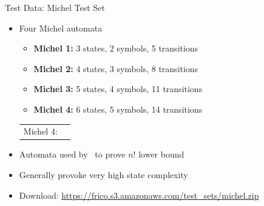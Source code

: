 \documentclass[12pt]{beamer}
\newcommand{\fat}[1]{\textbf{#1}}
\newcommand{\Michel}{
\begin{tikzpicture}[my automaton,semithick]
\scriptsize
\node[state,initial,accepting] (0)               {$q_0$};
\node[state,yshift=-0.2cm]                   (x) [below=of 0]  {$q_\#$};
\draw[->] (0) edge node[left] {\tiny\#} (x);
\draw[->] (x) edge[my below,loop] node[below] {\tiny $\#,1,2,3,4$} ();
\node[state,xshift=1cm]        (1) [right=of 0]  {$q_1$};
\draw[<->] (0) edge node[above,xshift=2mm,yshift=-0.5mm] {\tiny $1$} (1);
\draw[->] (1) edge[my right,loop] node[right] {\tiny $\#,1,2,3,4$} ();
\node[state,yshift=0.5cm]      (2) [below=of 1]  {$q_2$};
\draw[<->] (0) edge node[above,xshift=2mm,yshift=-1mm] {\tiny $2$} (2);
\draw[->] (2) edge[my right,loop] node[right] {\tiny $\#,1,2,3,4$} ();
\node[state,yshift=0.5cm]      (3) [below=of 2]  {$q_3$};
\draw[<->] (0) edge node[above,xshift=2mm,yshift=-1.5mm] {\tiny $3$} (3);
\draw[->] (3) edge[my right,loop] node[right] {\tiny $\#,1,2,3,4$} ();
\node[state,yshift=0.5cm]      (4) [below=of 3]  {$q_4$};
\draw[<->,shorten >=-0.2mm,shorten <=-0.2mm] (0) edge node[above,xshift=2mm,yshift=-2mm] {\tiny $4$} (4);
\draw[->] (4) edge[my right,loop] node[right] {\tiny $\#,1,2,3,4$} ();
\end{tikzpicture}
}
\begin{document}
\begin{frame}{Test Data: Michel Test Set}
\begin{itemize}
\item Four Michel automata
  \begin{itemize}
  \item \fat{Michel 1:} 3 states, 2 symbols, 5 transitions
  \item \fat{Michel 2:} 4 states, 3 symbols, 8 transitions
  \item \fat{Michel 3:} 5 states, 4 symbols, 11 transitions
  \item \fat{Michel 4:} 6 states, 5 symbols, 14 transitions
  \end{itemize} \par
\pause
\centering
{\renewcommand{\tabcolsep}{0cm}
\begin{tabular}{m{1.75cm}m{7cm}}
Michel 4: & \Michel
\end{tabular}}
\par
\pause
\raggedright
\item Automata used by~\cite{michel1988} to prove $n!$ lower bound
\item Generally provoke very high state complexity
\pause
\item Download: \url{https://frico.s3.amazonaws.com/test_sets/michel.zip}
\end{itemize}
\end{frame}
\end{document}
